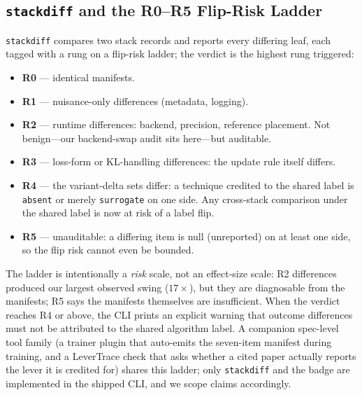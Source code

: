 \subsection{\texttt{stackdiff} and the R0--R5 Flip-Risk Ladder}
\label{sec:p6-stackdiff}
\texttt{stackdiff} compares two stack records and reports every differing
leaf, each tagged with a rung on a flip-risk ladder; the verdict is the
highest rung triggered:

\begin{itemize}[leftmargin=1.5em, itemsep=0.1em]
  \item \textbf{R0} --- identical manifests.
  \item \textbf{R1} --- nuisance-only differences (metadata, logging).
  \item \textbf{R2} --- runtime differences: backend, precision, reference
        placement. Not benign---our backend-swap audit sits here---but
        auditable.
  \item \textbf{R3} --- loss-form or KL-handling differences: the update rule
        itself differs.
  \item \textbf{R4} --- the variant-delta sets differ: a technique credited to
        the shared label is \texttt{absent} or merely \texttt{surrogate} on
        one side. Any cross-stack comparison under the shared label is now at
        risk of a label flip.
  \item \textbf{R5} --- unauditable: a differing item is null (unreported) on
        at least one side, so the flip risk cannot even be bounded.
\end{itemize}

The ladder is intentionally a \emph{risk} scale, not an effect-size scale: R2
differences produced our largest observed swing ($17\times$), but they are
diagnosable from the manifests; R5 says the manifests themselves are
insufficient. When the verdict reaches R4 or above, the CLI prints an explicit
warning that outcome differences must not be attributed to the shared
algorithm label. A companion spec-level tool family (a trainer plugin that
auto-emits the seven-item manifest during training, and a LeverTrace check
that asks whether a cited paper actually reports the lever it is credited for)
shares this ladder; only \texttt{stackdiff} and the badge are implemented in
the shipped CLI, and we scope claims accordingly.
